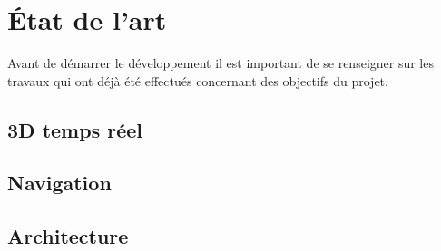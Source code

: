 \section{État de l'art}
Avant de démarrer le développement il est important de se renseigner sur les travaux qui ont déjà été effectués concernant des objectifs du projet.
\subsection{3D temps réel}
\subsection{Navigation}
\subsection{Architecture}